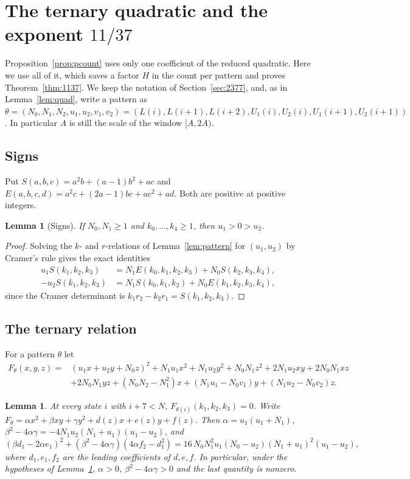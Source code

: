 \documentclass[11pt]{amsart}
\newtheorem{lemma}[theorem]{Lemma}
\theoremstyle{definition}
\theoremstyle{remark}
\begin{document}
\section{The ternary quadratic and the exponent \texorpdfstring{$11/37$}{11/37}}\label{sec:1137}

Proposition~\ref{prop:pcount} uses only one coefficient of the reduced quadratic. Here we use
all of it, which saves a factor $H$ in the count per pattern and proves
Theorem~\ref{thm:1137}. We keep the notation of Section~\ref{sec:2377}, and, as in
Lemma~\ref{lem:quad}, write a pattern as
$\theta=(N_0,N_1,N_2,u_1,u_2,v_1,v_2)=(L(i),L(i+1),L(i+2),U_1(i),U_2(i),U_1(i+1),U_2(i+1))$.
In particular $A$ is still the scale of the window $[A,2A)$.

\subsection{Signs}
Put $S(a,b,c)=a^2b+(a-1)b^2+ac$ and $E(a,b,c,d)=a^2c+(2a-1)bc+ac^2+ad$. Both are positive at
positive integers.

\begin{lemma}[Signs]\label{lem:signs}
If $N_0,N_1\ge1$ and $k_0,\dots,k_4\ge1$, then $u_1>0>u_2$.
\end{lemma}

\begin{proof}
Solving the $k$- and $r$-relations of Lemma~\ref{lem:pattern} for $(u_1,u_2)$ by Cramer's rule
gives the exact identities
\begin{align*}
u_1S(k_1,k_2,k_3)&=N_1E(k_0,k_1,k_2,k_3)+N_0S(k_2,k_3,k_4),\\
-u_2S(k_1,k_2,k_3)&=N_1S(k_0,k_1,k_2)+N_0E(k_1,k_2,k_3,k_4),
\end{align*}
since the Cramer determinant is $k_1r_2-k_2r_1=S(k_1,k_2,k_3)$.
\end{proof}

\subsection{The ternary relation}
For a pattern $\theta$ let
\begin{align*}
F_\theta(x,y,z)={}&(u_1x+u_2y+N_0z)^2+N_1u_1x^2+N_1u_2y^2+N_0N_1z^2+2N_1u_2xy+2N_0N_1xz\\
&+2N_0N_1yz+(N_0N_2-N_1^2)x+(N_1u_1-N_0v_1)y+(N_1u_2-N_0v_2)z .
\end{align*}

\begin{lemma}\label{lem:tern}
At every state $i$ with $i+7<N$, $F_{\theta(i)}(k_1,k_2,k_3)=0$. Write $F_\theta=\alpha x^2+\beta xy+\gamma
y^2+d(z)x+e(z)y+f(z)$. Then $\alpha=u_1(u_1+N_1)$,
$\beta^2-4\alpha\gamma=-4N_1u_2(N_1+u_1)(u_1-u_2)$, and
\[
(\beta d_1-2\alpha e_1)^2+(\beta^2-4\alpha\gamma)(4\alpha f_2-d_1^2)
=16\,N_0N_1^2u_1(N_0-u_2)(N_1+u_1)^2(u_1-u_2),
\]
where $d_1,e_1,f_2$ are the leading coefficients of $d,e,f$. In particular, under the
hypotheses of Lemma~\ref{lem:signs}, $\alpha>0$, $\beta^2-4\alpha\gamma>0$ and the last
quantity is nonzero.
\end{lemma}
\end{document}
